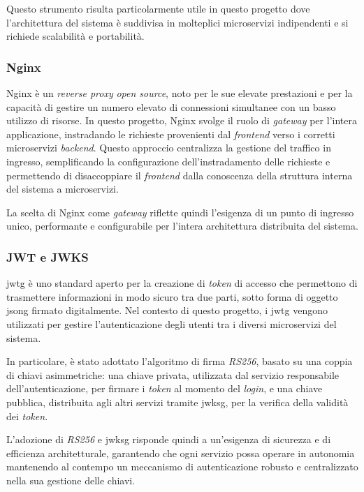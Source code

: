 Questo strumento risulta particolarmente utile in questo progetto dove l'architettura del sistema è 
suddivisa in molteplici microservizi indipendenti e si richiede scalabilità e portabilità.

\subsubsection{Nginx}
Nginx è un \textit{reverse proxy} \textit{open source}, noto per le sue elevate prestazioni e per la capacità 
di gestire un numero elevato di connessioni simultanee con un basso utilizzo di risorse. 
In questo progetto, Nginx svolge il ruolo di \textit{gateway} per l'intera applicazione, instradando le richieste 
provenienti dal \textit{frontend} verso i corretti microservizi \textit{backend}.
Questo approccio centralizza la gestione del traffico in ingresso, semplificando la configurazione dell'instradamento 
delle richieste e permettendo di disaccoppiare il \textit{frontend} dalla conoscenza della struttura interna 
del sistema a microservizi.

La scelta di Nginx come \textit{gateway} riflette quindi l'esigenza di un punto di ingresso unico, 
performante e configurabile per l'intera architettura distribuita del sistema.

\subsubsection{JWT e JWKS}
\gls{jwtg} è uno standard aperto per la creazione di \textit{token} di accesso che permettono di trasmettere informazioni 
in modo sicuro tra due parti, sotto forma di oggetto \gls{jsong} firmato digitalmente. 
Nel contesto di questo progetto, i \gls{jwtg} vengono utilizzati per gestire l'autenticazione degli utenti tra 
i diversi microservizi del sistema.

In particolare, è stato adottato l'algoritmo di firma \textit{RS256}, basato su una coppia di chiavi asimmetriche: 
una chiave privata, utilizzata dal servizio responsabile dell'autenticazione, per firmare i \textit{token} al momento del \textit{login}, 
e una chiave pubblica, distribuita agli altri servizi tramite \gls{jwksg}\glsfirstoccur , per la verifica della validità 
dei \textit{token}. 

L'adozione di \textit{RS256} e \gls{jwksg} risponde quindi a un'esigenza di sicurezza e di efficienza architetturale, 
garantendo che ogni servizio possa operare in autonomia mantenendo al contempo un meccanismo di autenticazione robusto 
e centralizzato nella sua gestione delle chiavi.

